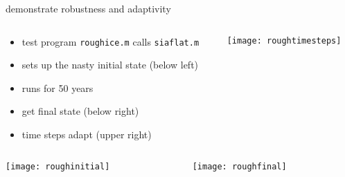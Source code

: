 \begin{frame}{demonstrate robustness and adaptivity}

\begin{columns}
\begin{column}{0.6\textwidth}
\small
\begin{itemize}
\item test program \texttt{roughice.m} calls \texttt{siaflat.m}
\item sets up the nasty initial state (below left)
\item runs for 50 years
\item get final state (below right)
\item time steps adapt (upper right)
\end{itemize}
\end{column}
\begin{column}{0.4\textwidth}
\texttt{[image: roughtimesteps]}
\end{column}
\end{columns}

\bigskip
\begin{columns}
\begin{column}{0.5\textwidth}
\texttt{[image: roughinitial]}
\end{column}
\begin{column}{0.5\textwidth}
\texttt{[image: roughfinal]}
\end{column}
\end{columns}
\end{frame}


